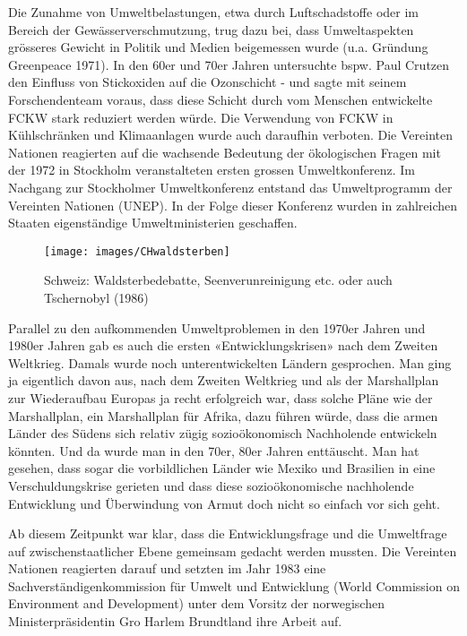 \documentclass[
]{book}
\begin{document}
Die Zunahme von Umweltbelastungen, etwa durch Luftschadstoffe oder im Bereich der Gewässerverschmutzung, trug dazu bei, dass Umweltaspekten grösseres Gewicht in Politik und Medien beigemessen wurde (u.a. Gründung Greenpeace 1971). In den 60er und 70er Jahren untersuchte bspw. Paul Crutzen den Einfluss von Stickoxiden auf die Ozonschicht - und sagte mit seinem Forschendenteam voraus, dass diese Schicht durch vom Menschen entwickelte FCKW stark reduziert werden würde. Die Verwendung von FCKW in Kühlschränken und Klimaanlagen wurde auch daraufhin verboten. Die Vereinten Nationen reagierten auf die wachsende Bedeutung der ökologischen Fragen mit der 1972 in Stockholm veranstalteten ersten grossen Umweltkonferenz. Im Nachgang zur Stockholmer Umweltkonferenz entstand das Umweltprogramm der Vereinten Nationen (UNEP). In der Folge dieser Konferenz wurden in zahlreichen Staaten eigenständige Umweltministerien geschaffen.

\begin{figure}

{\centering \texttt{[image: images/CHwaldsterben]} 

}

\caption{Schweiz: Waldsterbedebatte, Seenverunreinigung etc. oder auch Tschernobyl (1986)}\label{fig:chwaldsterben}
\end{figure}

Parallel zu den aufkommenden Umweltproblemen in den 1970er Jahren und 1980er Jahren gab es auch die ersten «Entwicklungskrisen» nach dem Zweiten Weltkrieg. Damals wurde noch unterentwickelten Ländern gesprochen. Man ging ja eigentlich davon aus, nach dem Zweiten Weltkrieg und als der Marshallplan zur Wiederaufbau Europas ja recht erfolgreich war, dass solche Pläne wie der Marshallplan, ein Marshallplan für Afrika, dazu führen würde, dass die armen Länder des Südens sich relativ zügig sozioökonomisch Nachholende entwickeln könnten. Und da wurde man in den 70er, 80er Jahren enttäuscht. Man hat gesehen, dass sogar die vorbildlichen Länder wie Mexiko und Brasilien in eine Verschuldungskrise gerieten und dass diese sozioökonomische nachholende Entwicklung und Überwindung von Armut doch nicht so einfach vor sich geht.

Ab diesem Zeitpunkt war klar, dass die Entwicklungsfrage und die Umweltfrage auf zwischenstaatlicher Ebene gemeinsam gedacht werden mussten. Die Vereinten Nationen reagierten darauf und setzten im Jahr 1983 eine Sachverständigenkommission für Umwelt und Entwicklung (World Commission on Environment and Development) unter dem Vorsitz der norwegischen Ministerpräsidentin Gro Harlem Brundtland ihre Arbeit auf.
\end{document}
